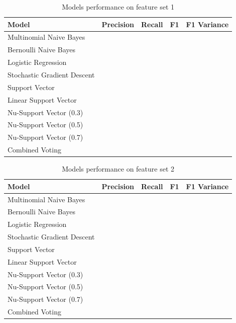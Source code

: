 \documentclass[11pt,oneside]{book}
\begin{document}
\begin{longtable}{|l|l|l|l|l|}
\caption{Models performance on feature set 1}
\label{tab:ner_re_feature_set_1}\\
\hline
\textbf{Model}          & \multicolumn{1}{c|}{\textbf{Precision}} & \multicolumn{1}{c|}{\textbf{Recall}} & \textbf{F1} & \textbf{F1 Variance} \\ \hline
\endfirsthead
%
\endhead
%
Multinomial Naive Bayes & \multicolumn{1}{c|}{}                   & \multicolumn{1}{c|}{}                &             &                      \\ \hline
Bernoulli Naive Bayes       &  &  &  &  \\ \hline
Logistic Regression         &  &  &  &  \\ \hline
Stochastic Gradient Descent &  &  &  &  \\ \hline
Support Vector              &  &  &  &  \\ \hline
Linear Support Vector       &  &  &  &  \\ \hline
Nu-Support Vector (0.3)     &  &  &  &  \\ \hline
Nu-Support Vector (0.5)     &  &  &  &  \\ \hline
Nu-Support Vector (0.7)     &  &  &  &  \\ \hline
Combined Voting             &  &  &  &  \\ \hline
\end{longtable}

\begin{longtable}{|l|l|l|l|l|}
\caption{Models performance on feature set 2}
\label{tab:ner_re_feature_set_2}\\
\hline
\textbf{Model}          & \multicolumn{1}{c|}{\textbf{Precision}} & \multicolumn{1}{c|}{\textbf{Recall}} & \textbf{F1} & \textbf{F1 Variance} \\ \hline
\endfirsthead
%
\endhead
%
Multinomial Naive Bayes & \multicolumn{1}{c|}{}                   & \multicolumn{1}{c|}{}                &             &                      \\ \hline
Bernoulli Naive Bayes       &  &  &  &  \\ \hline
Logistic Regression         &  &  &  &  \\ \hline
Stochastic Gradient Descent &  &  &  &  \\ \hline
Support Vector              &  &  &  &  \\ \hline
Linear Support Vector       &  &  &  &  \\ \hline
Nu-Support Vector (0.3)     &  &  &  &  \\ \hline
Nu-Support Vector (0.5)     &  &  &  &  \\ \hline
Nu-Support Vector (0.7)     &  &  &  &  \\ \hline
Combined Voting             &  &  &  &  \\ \hline
\end{longtable}
\end{document}
